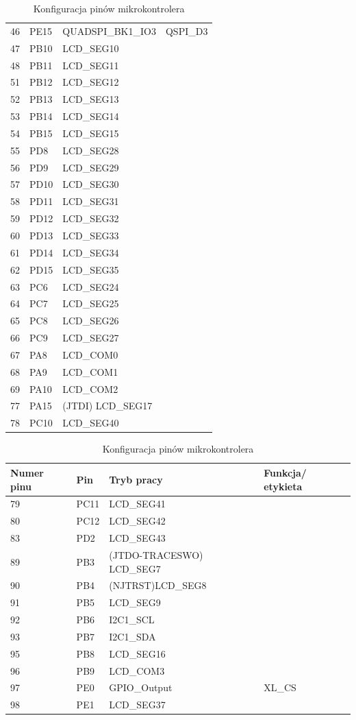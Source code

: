 \documentclass[10pt, a4paper]{article}
\begin{document}
\begin{table}[H]
\begin{tabular}{|l|l|l|l|}
46	&	PE15&	QUADSPI\_BK1\_IO3	&	QSPI\_D3\\
47	&	PB10&	LCD\_SEG10	&\\
48	&	PB11&	LCD\_SEG11	&\\
51	&	PB12&	LCD\_SEG12	&\\
52	&	PB13&	LCD\_SEG13	&\\
53	&	PB14&	LCD\_SEG14	&\\
54 &	PB15&	LCD\_SEG15	&\\
55	&	PD8	&	LCD\_SEG28	&\\
56	&	PD9	&	LCD\_SEG29	&\\
57	&	PD10&	LCD\_SEG30	& \\
58	&	PD11&	LCD\_SEG31	&\\
59	&	PD12&	LCD\_SEG32	&\\
60	&	PD13&	LCD\_SEG33	&\\
61	&	PD14&	LCD\_SEG34	&\\
62	&	PD15&	LCD\_SEG35	&\\
63	&	PC6	&	LCD\_SEG24	&\\
64	&	PC7	&	LCD\_SEG25	&\\
65	&	PC8	&	LCD\_SEG26	&\\
66	&	PC9	&	LCD\_SEG27	&\\
67	&	PA8	&	LCD\_COM0	&\\
68	&	PA9	&	LCD\_COM1	&\\
69	&	PA10&	LCD\_COM2	&\\
77	&	PA15 &	(JTDI) LCD\_SEG17&	\\
78	&	PC10&	LCD\_SEG40	&\\ \hline

\end{tabular}
\caption{Konfiguracja pinów mikrokontrolera}
\end{table}

\begin{table}[H]
\centering
\begin{tabular}{|l|l|l|l|}
\hline
Numer pinu & Pin & Tryb pracy & Funkcja/ etykieta \\ \hline
79	&	PC11&	LCD\_SEG41	&\\
80	&	PC12&	LCD\_SEG42	&\\
83	&	PD2	&	LCD\_SEG43	&\\
89	&	PB3 &	(JTDO-TRACESWO)	LCD\_SEG7&\\	
90	&	PB4 &	(NJTRST)LCD\_SEG8	&\\
91	&	PB5	&	LCD\_SEG9	&\\
92	&	PB6	&	I2C1\_SCL	&\\
93	&	PB7	&	I2C1\_SDA	&\\
95	&	PB8	&	LCD\_SEG16	&\\
96	&	PB9	&	LCD\_COM3	&\\
97	&	PE0	&	GPIO\_Output	&		XL\_CS\\
98	&	PE1	&	LCD\_SEG37	&\\ \hline

\end{tabular}
\caption{Konfiguracja pinów mikrokontrolera}
\end{table}
\end{document}
